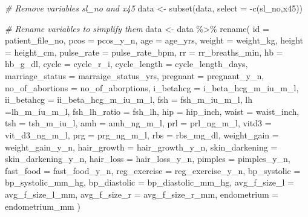\documentclass[
]{article}
\newenvironment{Shaded}{\begin{snugshade}}{\end{snugshade}}
\newcommand{\AttributeTok}[1]{\textcolor[rgb]{0.77,0.63,0.00}{#1}}
\newcommand{\CommentTok}[1]{\textcolor[rgb]{0.56,0.35,0.01}{\textit{#1}}}
\newcommand{\FunctionTok}[1]{\textcolor[rgb]{0.00,0.00,0.00}{#1}}
\newcommand{\NormalTok}[1]{#1}
\newcommand{\OtherTok}[1]{\textcolor[rgb]{0.56,0.35,0.01}{#1}}
\newcommand{\SpecialCharTok}[1]{\textcolor[rgb]{0.00,0.00,0.00}{#1}}
\begin{document}
\begin{Shaded}
\begin{Highlighting}[]
\CommentTok{\# Remove variables \textquotesingle{}sl\_no\textquotesingle{} and \textquotesingle{}x45\textquotesingle{}}
\NormalTok{data }\OtherTok{\textless{}{-}} \FunctionTok{subset}\NormalTok{(data, }\AttributeTok{select =} \SpecialCharTok{{-}}\FunctionTok{c}\NormalTok{(sl\_no,x45))}

\CommentTok{\# Rename variables to simplify them}
\NormalTok{data }\OtherTok{\textless{}{-}}\NormalTok{ data }\SpecialCharTok{\%\textgreater{}\%} 
  \FunctionTok{rename}\NormalTok{(}
    \AttributeTok{id =}\NormalTok{ patient\_file\_no,}
    \AttributeTok{pcos =}\NormalTok{ pcos\_y\_n,}
    \AttributeTok{age =}\NormalTok{ age\_yrs,}
    \AttributeTok{weight =}\NormalTok{ weight\_kg,}
    \AttributeTok{height =}\NormalTok{ height\_cm,}
    \AttributeTok{pulse\_rate =}\NormalTok{ pulse\_rate\_bpm,}
    \AttributeTok{rr =}\NormalTok{ rr\_breaths\_min,}
    \AttributeTok{hb =}\NormalTok{ hb\_g\_dl,}
    \AttributeTok{cycle =}\NormalTok{ cycle\_r\_i,}
    \AttributeTok{cycle\_length =}\NormalTok{ cycle\_length\_days,}
    \AttributeTok{marriage\_status =}\NormalTok{ marraige\_status\_yrs,}
    \AttributeTok{pregnant =}\NormalTok{ pregnant\_y\_n,}
    \AttributeTok{no\_of\_abortions =}\NormalTok{ no\_of\_aborptions,}
    \AttributeTok{i\_betahcg =}\NormalTok{ i\_beta\_hcg\_m\_iu\_m\_l,}
    \AttributeTok{ii\_betahcg =}\NormalTok{ ii\_beta\_hcg\_m\_iu\_m\_l,}
    \AttributeTok{fsh =}\NormalTok{ fsh\_m\_iu\_m\_l,}
    \AttributeTok{lh =}\NormalTok{lh\_m\_iu\_m\_l,}
    \AttributeTok{fsh\_lh\_ratio =}\NormalTok{ fsh\_lh,}
    \AttributeTok{hip =}\NormalTok{ hip\_inch,}
    \AttributeTok{waist =}\NormalTok{ waist\_inch,}
    \AttributeTok{tsh =}\NormalTok{ tsh\_m\_iu\_l,}
    \AttributeTok{amh =}\NormalTok{ amh\_ng\_m\_l,}
    \AttributeTok{prl =}\NormalTok{ prl\_ng\_m\_l,}
    \AttributeTok{vitd3 =}\NormalTok{ vit\_d3\_ng\_m\_l,}
    \AttributeTok{prg =}\NormalTok{ prg\_ng\_m\_l,}
    \AttributeTok{rbs =}\NormalTok{ rbs\_mg\_dl,}
    \AttributeTok{weight\_gain =}\NormalTok{ weight\_gain\_y\_n,}
    \AttributeTok{hair\_growth =}\NormalTok{ hair\_growth\_y\_n,}
    \AttributeTok{skin\_darkening =}\NormalTok{ skin\_darkening\_y\_n,}
    \AttributeTok{hair\_loss =}\NormalTok{ hair\_loss\_y\_n,}
    \AttributeTok{pimples =}\NormalTok{ pimples\_y\_n,}
    \AttributeTok{fast\_food =}\NormalTok{ fast\_food\_y\_n,}
    \AttributeTok{reg\_exercise =}\NormalTok{ reg\_exercise\_y\_n,}
    \AttributeTok{bp\_systolic =}\NormalTok{ bp\_systolic\_mm\_hg,}
    \AttributeTok{bp\_diastolic =}\NormalTok{ bp\_diastolic\_mm\_hg,}
    \AttributeTok{avg\_f\_size\_l =}\NormalTok{ avg\_f\_size\_l\_mm,}
    \AttributeTok{avg\_f\_size\_r =}\NormalTok{ avg\_f\_size\_r\_mm,}
    \AttributeTok{endometrium =}\NormalTok{ endometrium\_mm}
\NormalTok{    )}


\end{Highlighting}
\end{Shaded}
\end{document}
